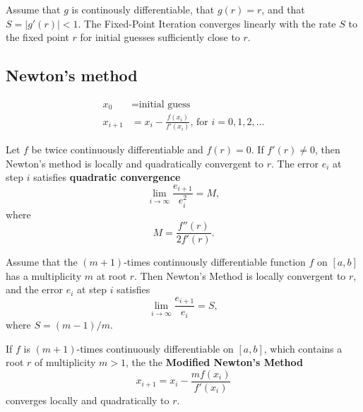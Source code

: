 \begin{theorem*}
Assume that $g$ is continously differentiable, that $g(r) = r$, and that $S = |g'(r)| < 1$. The Fixed-Point Iteration converges linearly with the rate $S$ to the fixed point $r$ for initial guesses sufficiently close to $r$.
\end{theorem*}

\subsection{Newton's method} 
\begin{align*}
x_0 & = \text{initial guess} \\
x_{i+1} &= x_i - \frac{f(x_i)}{f'(x_i)} \text{, for } i = 0,1,2,...
\end{align*}

\begin{theorem*}
Let $f$ be twice continuously differentiable and $f(r) = 0$. If $f'(r) \neq 0$, then Newton's method is locally and quadratically convergent to $r$. The error $e_i$ at step $i$ satisfies \textbf{quadratic convergence}
$$
\lim_{i \to \infty} \frac{e_{i+1}}{e_{i}^2} = M,
$$
where
$$
M = \frac{f''(r)}{2f'(r)}.
$$
\end{theorem*}

\begin{theorem*}
Assume that the $(m+1)$-times continuously differentiable function $f$ on $[a,b]$ has a multiplicity $m$ at root $r$. Then Newton's Method is locally convergent to $r$, and the error $e_i$ at step $i$ satisfies
$$
\lim_{i \to \infty} \frac{e_{i+1}}{e_{i}} = S,
$$
where $S = (m-1)/m$.
\end{theorem*}

\begin{theorem*}
If $f$ is $(m+1)$-times continuously differentiable on $[a,b]$, which contains a root $r$ of multiplicity $m > 1$, the the \textbf{Modified Newton's Method}
$$
x_{i+1} = x_i - \frac{m f(x_i)}{f'(x_i)}
$$
converges locally and quadratically to $r$.
\end{theorem*}
